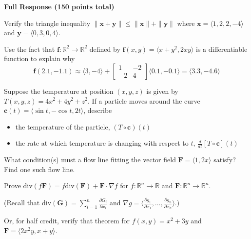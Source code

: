 \documentclass[12pt]{exam}
\newcommand{\vect}[1]{\ensuremath{\mathbf{#1}}}
\newcommand{\<}{\langle}
\renewcommand{\>}{\rangle}
\newcommand{\p}{\partial}
\begin{document}
\begin{center}
  \textbf{Full Response (150 points total)}
\end{center}

\begin{questions}

\setcounter{question}{5}

\question[30]
  Verify the triangle inequality \(\|\vect x+\vect y\|\leq\|\vect x\|+\|\vect y\|\)
  where \(\vect x=\<1,2,2,-4\>\) and \(\vect y =\<0,3,0,4\>\).

  \vfill



\newpage

\question[30]
  Use the fact that \(\vect f:\mathbb R^2\to\mathbb R^2\)
  defined by \(\vect f(x,y)=\<x+y^2,2xy\>\) is a differentiable
  function to explain why
  \[
    \vect f(2.1,-1.1)
      \approx
    \<3,-4\>
      +
    \left[
    \begin{matrix}
      1 & -2 \\
      -2 & 4
    \end{matrix}
    \right]
    \<0.1,-0.1\>
      =
    \<3.3,-4.6\>
  \]

  \vfill



\newpage

\question[30]
  Suppose the temperature at position \((x,y,z)\) is given by
  \(T(x,y,z)=4x^2+4y^2+z^2\). If a particle moves around the curve
  \(\vect c(t)=\<\sin t,-\cos t,2t\>\), describe
  \begin{itemize}
    \item the temperature
  of the particle, \((T\circ\vect c)(t)\)
  \vfill
    \item the rate at which temperature is changing with respect to \(t\),
  \(\frac{d}{dt}[T\circ\vect c](t)\)
  \vfill
  \end{itemize}


\newpage

\question[30]
  What condition(s) must a flow line fitting the vector field
  \(\vect F=\<1,2x\>\) satisfy? Find one such flow line.


\newpage

\question[30]
  Prove \(\textrm{div}(f\vect F)=f\textrm{div}(\vect F)+\vect F\cdot\nabla f\)
  for \(f:\mathbb R^n\to\mathbb R\) and \(\vect F:\mathbb R^n\to\mathbb R^n\).

  (Recall that \(\textrm{div}(\vect G)=\sum_{i=1}^{n}\frac{\p G_i}{\p x_i}\)
  and \(\nabla g=\<\frac{\p g_1}{\p x_1},\dots,\frac{\p g_n}{\p x_n}\>\).)

  Or, for half credit, verify that theorem for \(f(x,y)=x^2+3y\) and
  \(\vect F=\<2x^2y,x+y\>\).

\end{questions}
\end{document}
